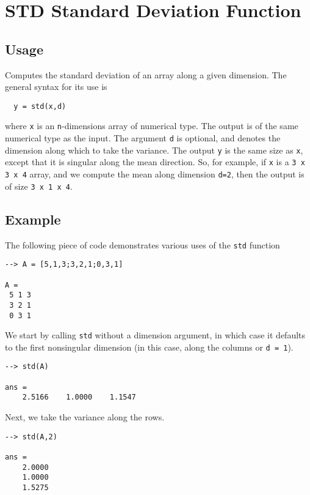 \section{STD Standard Deviation Function}

\subsection{Usage}

Computes the standard deviation of an array along a given dimension.  
The general syntax for its use is
\begin{verbatim}
  y = std(x,d)
\end{verbatim}
where \verb|x| is an \verb|n|-dimensions array of numerical type.
The output is of the same numerical type as the input.  The argument
\verb|d| is optional, and denotes the dimension along which to take
the variance.  The output \verb|y| is the same size as \verb|x|, except
that it is singular along the mean direction.  So, for example,
if \verb|x| is a \verb|3 x 3 x 4| array, and we compute the mean along
dimension \verb|d=2|, then the output is of size \verb|3 x 1 x 4|.
\subsection{Example}

The following piece of code demonstrates various uses of the \verb|std|
function
\begin{verbatim}
--> A = [5,1,3;3,2,1;0,3,1]

A = 
 5 1 3 
 3 2 1 
 0 3 1 
\end{verbatim}
We start by calling \verb|std| without a dimension argument, in which 
case it defaults to the first nonsingular dimension (in this case, 
along the columns or \verb|d = 1|).
\begin{verbatim}
--> std(A)

ans = 
    2.5166    1.0000    1.1547 
\end{verbatim}
Next, we take the variance along the rows.
\begin{verbatim}
--> std(A,2)

ans = 
    2.0000 
    1.0000 
    1.5275 
\end{verbatim}
